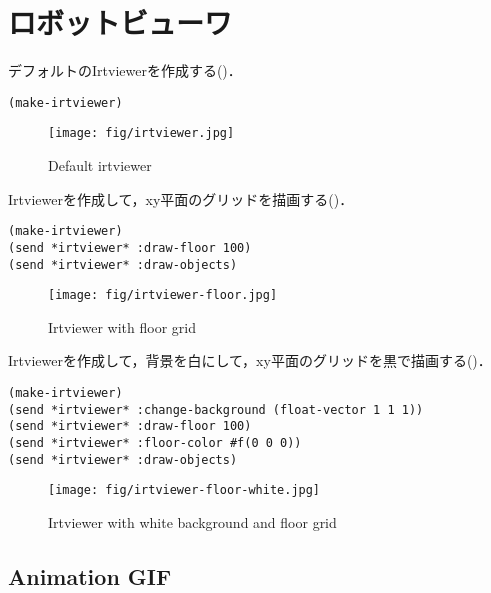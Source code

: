 \section{ロボットビューワ}

デフォルトのIrtviewerを作成する()．
\begin{verbatim}
(make-irtviewer)
\end{verbatim}
\begin{figure}[htb]
  \begin{center}
    \texttt{[image: fig/irtviewer.jpg]}
    \caption{Default irtviewer}
  \end{center}
\end{figure}

Irtviewerを作成して，xy平面のグリッドを描画する()．
\begin{verbatim}
(make-irtviewer)
(send *irtviewer* :draw-floor 100)
(send *irtviewer* :draw-objects)
\end{verbatim}
\begin{figure}[htb]
  \begin{center}
    \texttt{[image: fig/irtviewer-floor.jpg]}
    \caption{Irtviewer with floor grid}
  \end{center}
\end{figure}

Irtviewerを作成して，背景を白にして，xy平面のグリッドを黒で描画する()．
\begin{verbatim}
(make-irtviewer)
(send *irtviewer* :change-background (float-vector 1 1 1))
(send *irtviewer* :draw-floor 100)
(send *irtviewer* :floor-color #f(0 0 0))
(send *irtviewer* :draw-objects)
\end{verbatim}
\begin{figure}[htb]
  \begin{center}
    \texttt{[image: fig/irtviewer-floor-white.jpg]}
    \caption{Irtviewer with white background and floor grid}
  \end{center}
\end{figure}





\subsection{Animation GIF}

